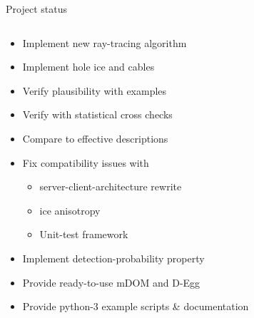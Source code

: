 
\begin{frame}[fragile]{Project status}

  \begin{columns}
    \begin{column}{0.5\textwidth}
      \begin{overlayarea}{\textwidth}{\textheight}
        \begin{itemize}
          \item<alert@1>[\done] Implement new ray-tracing algorithm
          \item<alert@2>[\done] Implement hole ice and cables
          \item<alert@3>[\done] Verify plausibility with examples
          \item<alert@4>[\done] Verify with statistical cross checks
          \item<alert@5>[\done] Compare to effective descriptions
          \item<alert@6>[\inprogress] Fix compatibility issues with
          \begin{itemize}
            \item[\inprogress] server-client-architecture rewrite
            \item[\tobedone] ice anisotropy
            \item[\tobedone] Unit-test framework
          \end{itemize}
          \item<alert@7>[\tobedone] Implement detection-probability property
          \item<alert@8>[\tobedone] Provide ready-to-use mDOM and D-Egg
          \item<alert@9>[\tobedone] Provide python-3 example scripts \& documentation
        \end{itemize}
      \end{overlayarea}
    \end{column}
    \begin{column}{0.5\textwidth}%
\end{column}
\end{columns}
\end{frame}
